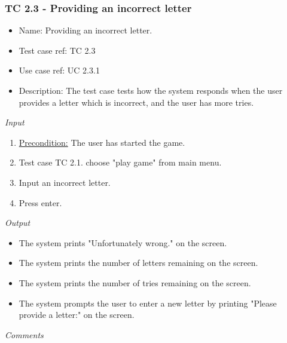 \documentclass[12pt, letterpaper]{article}
\begin{document}
\subsubsection{TC 2.3 - Providing an incorrect letter}
\begin{itemize}
	\item Name: Providing an incorrect letter.
	\item Test case ref: TC 2.3
	\item Use case ref: UC 2.3.1
	\item Description: The test case tests how the system responds when the user provides a letter which is incorrect, and the user has more tries.
\end{itemize}
\emph{Input}
\begin{enumerate}
	\item \underline{Precondition:} The user has started the game.
	\item Test case TC 2.1. choose "play game" from main menu.
	\item Input an incorrect letter.
	\item Press enter.
\end{enumerate}
\emph{Output}
\begin{itemize}
	\item The system prints "Unfortunately wrong." on the screen.
	\item The system prints the number of letters remaining on the screen.
	\item The system prints the number of tries remaining on the screen.
	\item The system prompts the user to enter a new letter by printing "Please provide a letter:" on the screen.
\end{itemize}
\emph{Comments}
\newline
\newline
\newline
\newline
\newline
\newline
\newline
\end{document}
